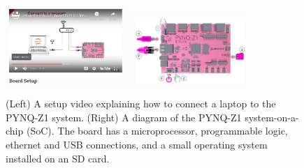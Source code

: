 \documentclass[../../../main.tex]{subfiles}
\begin{document}
\begin{figure}
\centering
\includegraphics[width=0.4\textwidth]{figures/pynq1.png}
\includegraphics[width=0.4\textwidth]{figures/pynq2.png}
\caption{\label{fig:pynq} (Left) A setup video explaining how to connect a laptop to the PYNQ-Z1 system. (Right) A diagram of the PYNQ-Z1 system-on-a-chip (SoC).  The board has a microprocessor, programmable logic, ethernet and USB connections, and a small operating system installed on an SD card.}
\end{figure}
\end{document}
